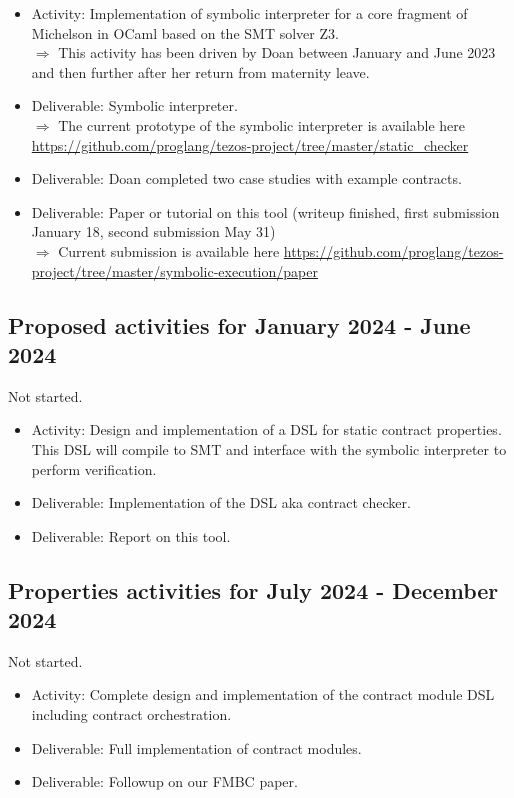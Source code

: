 \documentclass[a4paper,11pt]{article}
\begin{document}
\begin{itemize}
\item Activity: Implementation of symbolic interpreter for a core
  fragment of Michelson in OCaml based on the SMT solver Z3. \\
  $\Rightarrow$ This activity has been driven by Doan between January and June
  2023 and then further after her return from maternity leave. 
\item Deliverable: Symbolic interpreter. \\
  $\Rightarrow$ The current prototype of the symbolic interpreter is available here
  \url{https://github.com/proglang/tezos-project/tree/master/static_checker}
\item Deliverable: Doan completed two case studies with example contracts.
\item Deliverable: Paper or tutorial on this tool (writeup finished,
  first submission January 18, second submission May 31) \\
  $\Rightarrow$ Current submission is available here \url{https://github.com/proglang/tezos-project/tree/master/symbolic-execution/paper}
\end{itemize}

\subsection{Proposed activities for January 2024 - June 2024}
\label{sec:january-2024-june}

Not started.

\begin{itemize}
\item Activity: Design and implementation of a DSL for static contract properties. This DSL will compile to SMT and interface with the symbolic interpreter to perform verification.  
\item Deliverable: Implementation of the DSL aka contract checker.
\item Deliverable: Report on this tool.
\end{itemize}

\subsection{Properties activities for July 2024 - December 2024}
\label{sec:july-2024-december}

Not started.

\begin{itemize}
\item Activity: Complete design and implementation of the contract module DSL including contract orchestration. 
\item Deliverable: Full implementation of contract modules.
\item Deliverable: Followup on our FMBC paper. 
\end{itemize}



\end{document}
